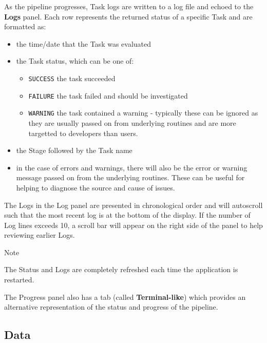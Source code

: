 \documentclass[
  8pt,
  a4paper]{article}
\providecommand{\tightlist}{%
  \setlength{\itemsep}{0pt}\setlength{\parskip}{0pt}}
\begin{document}
As the pipeline progresses, Task logs are written to a log file and
echoed to the \textbf{Logs} panel. Each row represents the returned
status of a specific Task and are formatted as:

\begin{itemize}
\tightlist
\item
  the time/date that the Task was evaluated
\item
  the Task status, which can be one of:

  \begin{itemize}
  \tightlist
  \item
    \texttt{SUCCESS} the task succeeded
  \item
    \texttt{FAILURE} the task failed and should be investigated
  \item
    \texttt{WARNING} the task contained a warning - typically these can
    be ignored as they are usually passed on from underlying routines
    and are more targetted to developers than users.
  \end{itemize}
\item
  the Stage followed by the Task name
\item
  in the case of errors and warnings, there will also be the error or
  warning message passed on from the underlying routines. These can be
  useful for helping to diagnose the source and cause of issues.
\end{itemize}

The Logs in the Log panel are presented in chronological order and will
autoscroll such that the most recent log is at the bottom of the
display. If the number of Log lines exceeds 10, a scroll bar will appear
on the right side of the panel to help reviewing earlier Logs.

\begin{tcolorbox}[enhanced jigsaw, opacityback=0, breakable, arc=.35mm, toprule=.15mm, left=2mm, bottomrule=.15mm, rightrule=.15mm, colback=white, leftrule=.75mm, colframe=quarto-callout-color-frame]

Note

The Status and Logs are completely refreshed each time the application
is restarted.

\end{tcolorbox}

The Progress panel also has a tab (called \textbf{Terminal-like}) which
provides an alternative representation of the status and progress of the
pipeline.

\subsection{Data}\label{sec-data}
\end{document}
